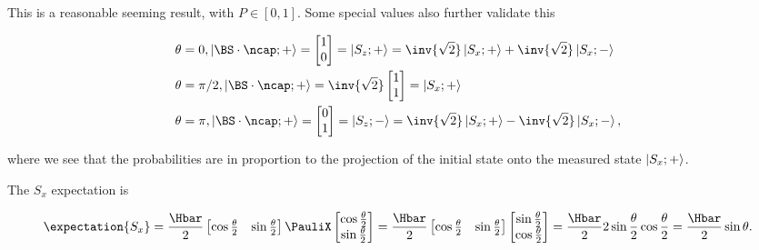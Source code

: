 {This is a reasonable seeming result, with \( P \in [0, 1] \).  Some special values also further validate this

\begin{equation}\label{eqn:moreBraKetProblems:760}
\begin{aligned}
\theta &= 0, \ket{\BS \cdot \ncap ; + } =
\begin{bmatrix}
1 \\
0
\end{bmatrix}
=
\ket{S_z ; +} 
= 
\inv{\sqrt{2}} \ket{S_x;+}
+\inv{\sqrt{2}} \ket{S_x;-}
\\
\theta &= \pi/2, \ket{\BS \cdot \ncap ; + } =
\inv{\sqrt{2}}
\begin{bmatrix}
1 \\
1
\end{bmatrix}
=
\ket{S_x ; +} 
\\
\theta &= \pi, \ket{\BS \cdot \ncap ; + } =
\begin{bmatrix}
0 \\
1
\end{bmatrix}
=
\ket{S_z ; -} 
= 
\inv{\sqrt{2}} \ket{S_x;+}
-\inv{\sqrt{2}} \ket{S_x;-},
\end{aligned}
\end{equation}

where we see that the probabilities are in proportion to the projection of the initial state onto the measured state \( \left\lvert {S_x ; +} \right\rangle \).


The \( S_x \) expectation is

\begin{dmath}\label{eqn:moreBraKetProblems:780}
\expectation{S_x} 
=
\frac{\Hbar}{2}
\begin{bmatrix}
\cos\frac{\theta}{2} & \sin\frac{\theta}{2}
\end{bmatrix}
\PauliX
\begin{bmatrix}
\cos\frac{\theta}{2} \\
\sin\frac{\theta}{2}
\end{bmatrix}
=
\frac{\Hbar}{2}
\begin{bmatrix}
\cos\frac{\theta}{2} & \sin\frac{\theta}{2}
\end{bmatrix}
\begin{bmatrix}
\sin\frac{\theta}{2} \\
\cos\frac{\theta}{2} 
\end{bmatrix}
=
\frac{\Hbar}{2} 2 \sin\frac{\theta}{2} \cos\frac{\theta}{2} 
=
\frac{\Hbar}{2} \sin\theta.
\end{dmath}

}
